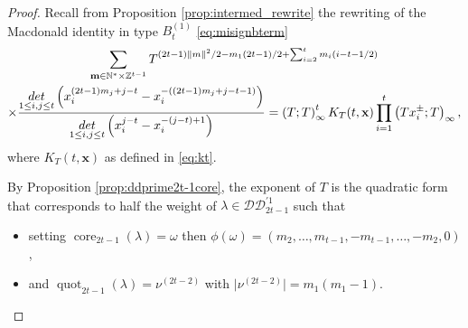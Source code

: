 \documentclass[11pt,letterpaper]{amsart}
\def\bbbz{\mathbb Z}
\def\bbbn{\mathbb N}
\def\ccdd{\mathcal {DD}}
\DeclareMathOperator{\core}{core}
\DeclareMathOperator{\quot}{quot}
\def\det{{\rm det}}
\numberwithin{equation}{section}
\numberwithin{df}{section}
\begin{document}
\begin{proof}

Recall from Proposition \ref{prop:intermed_rewrite} the rewriting of the Macdonald identity in type $B_t^{(1)}$ \eqref{eq:misignbterm}
\begin{multline*}
\sum_{\mathbf{m}\in\mathbb{N}^*\times\bbbz^{t-1}}T^{(2t-1)\lVert m\rVert^2/2-m_1(2t-1)/2+\sum_{i=2}^tm_i(i-t-1/2)}\\\times\frac{\underset{1\le i,j\le t}{\det}\left(x_i^{(2t-1)m_j+j-t}-x_i^{-((2t-1)m_j+j-t-1)}\right)}{\underset{1\le i,j\le t}{\det}\left(x_i^{j-t}-x_i^{-(j-t)+1}\right)}
=\left(T;T\right)_\infty^{t} K_T(t,\mathbf{x})\prod_{i=1}^t \left(Tx_i^{\pm};T\right)_\infty ,
\end{multline*}
where $K_T(t,\mathbf{x})$ as defined in \eqref{eq:kt}.

By Proposition \ref{prop:ddprime2t-1core}, the exponent of $T$ is the quadratic form that corresponds to half the weight of $\lambda\in\ccdd_{2t-1}^{'1}$ such that 
\begin{itemize}
\item setting $\core_{2t-1}(\lambda)=\omega$ then $\phi(\omega)=(m_2,\dots,m_{t-1},-m_{t-1},\dots,-m_2,0)$,
\item  and $\quot_{2t-1}(\lambda)=\nu^{(2t-2)}$ with $\lvert\nu^{(2t-2)}\rvert=m_1(m_1-1)$.
\end{itemize}


\end{proof}
\end{document}
